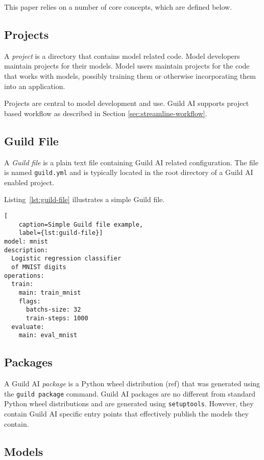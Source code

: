 \documentclass{article}
\begin{document}
This paper relies on a number of core concepts, which are defined
below.

\subsection{Projects}

A \emph{project} is a directory that contains model related
code. Model developers maintain projects for their models. Model users
maintain projects for the code that works with models, possibly
training them or otherwise incorporating them into an application.

Projects are central to model development and use. Guild AI supports
project based workflow as described in Section
\ref{sec:streamline-workflow}.

\subsection{Guild File}

A \emph{Guild file} is a plain text file containing Guild AI related
configuration. The file is named \verb|guild.yml| and is typically
located in the root directory of a Guild AI enabled project.

Listing~\ref{lst:guild-file} illustrates a simple Guild file.

\begin{lstlisting}[
    caption=Simple Guild file example,
    label={lst:guild-file}]
model: mnist
description:
  Logistic regression classifier
  of MNIST digits
operations:
  train:
    main: train_mnist
    flags:
      batchs-size: 32
      train-steps: 1000
  evaluate:
    main: eval_mnist
\end{lstlisting}

\subsection{Packages}

A Guild AI \emph{package} is a Python wheel distribution (ref) that
was generated using the \verb|guild package| command. Guild AI
packages are no different from standard Python wheel distributions and
are generated using \verb|setuptools|. However, they contain Guild AI
specific entry points that effectively publish the models they
contain.

\subsection{Models}
\end{document}
